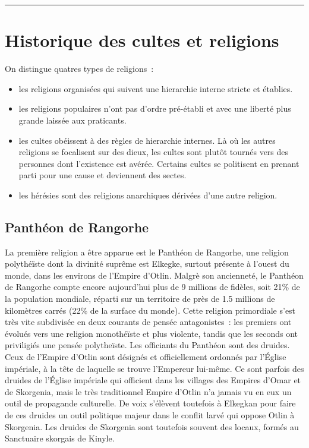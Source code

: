 \documentclass[french, a4paper, 12pt]{article}
\begin{document}
 \maketitle \vspace{3pt} \hrule \vspace{3pt}
	
\tableofcontents

\section{Historique des cultes et religions}

	On distingue quatres types de religions~:
	\begin{itemize}
		\item les religions organisées qui suivent une hierarchie interne stricte et établies.
	 	\item les religions populaires n'ont pas d'ordre pré-établi et avec une liberté plus grande laissée aux praticants. 
	 	\item les cultes obéissent à des règles de hierarchie internes. Là où les autres religions se focalisent sur des dieux, les cultes sont plutôt tournés vers des personnes dont l'existence est avérée. Certains cultes se politisent en prenant parti pour une cause et deviennent des sectes.
	 	\item les hérésies sont des religions anarchiques dérivées d'une autre religion.
	 \end{itemize}

	\subsection{Panthéon de Rangorhe}

		La première religion a être apparue est le Panthéon de Rangorhe, une religion polythéïste dont la divinité suprême est Elkegke, surtout présente à l'ouest du monde, dans les environs de l'Empire d'Otlin. Malgrè son ancienneté, le Panthéon de Rangorhe compte encore aujourd'hui plus de 9 millions de fidèles, soit 21\% de la population mondiale, réparti sur un territoire de près de 1.5 millions de kilomètres carrés (22\% de la surface du monde). Cette religion primordiale s'est très vite subdivisée en deux courants de pensée antagonistes~: les premiers ont évolués vers une religion monothéïste et plus violente, tandis que les seconds ont priviligiés une pensée polytheïste.
		Les officiants du Panthéon sont des druides. Ceux de l'Empire d'Otlin sont désignés et officiellement ordonnés par l'Église impériale, à la tête de laquelle se trouve l'Empereur lui-même. Ce sont parfois des druides de l'Église impériale qui officient dans les villages des Empires d'Omar et de Skorgenia, mais le très traditionnel Empire d'Otlin n'a jamais vu en eux un outil de propagande culturelle. De voix s'élèvent toutefois à Elkegkan pour faire de ces druides un outil politique majeur dans le conflit larvé qui oppose Otlin à Skorgenia.
		Les druides de Skorgenia sont toutefois souvent des locaux, formés au Sanctuaire skorgais de Kinyle.
\end{document}
